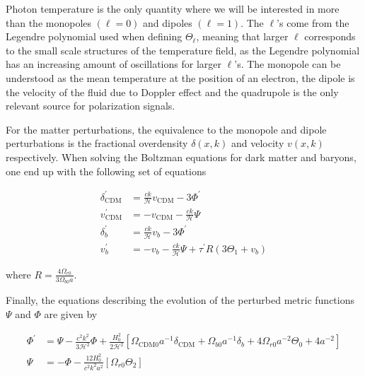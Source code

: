 \documentclass[12pt]{article}
\begin{document}
Photon temperature is the only quantity where we will be interested in more than the monopoles $(\ell = 0)$ and dipoles $(\ell = 1)$. The $\ell$'s come from the Legendre polynomial used when defining $\Theta_{\ell}$, meaning that larger $\ell$ corresponds to the small scale structures of the temperature field, as the Legendre polynomial has an increasing amount of oscillations for larger $\ell$'s. The monopole can be understood as the mean temperature at the position of an electron, the dipole is the velocity of the fluid due to Doppler effect and the quadrupole is the only relevant source for polarization signals. 


For the matter perturbations, the equivalence to the monopole and dipole perturbations is the fractional overdensity $\delta(x,k)$ and velocity $v(x,k)$ respectively. When solving the Boltzman equations for dark matter and baryons, one end up with the following set of equations

\begin{equation}\begin{aligned}\label{eq: matter perturbation dx}
    \delta_{\mathrm{CDM}}^{\prime} &=\frac{c k}{\mathcal{H}} v_{\mathrm{CDM}}-3 \Phi^{\prime} \\
    v_{\mathrm{CDM}}^{\prime} &=-v_{\mathrm{CDM}}-\frac{c k}{\mathcal{H}} \Psi \\
    \delta_{b}^{\prime} &=\frac{c k}{\mathcal{H}} v_{b}-3 \Phi^{\prime} \\
    v_{b}^{\prime} &=-v_{b}-\frac{c k}{\mathcal{H}} \Psi+\tau^{\prime} R\left(3 \Theta_{1}+v_{b}\right)
\end{aligned}\end{equation}

where $R=\frac{4 \Omega_{r 0}}{3 \Omega_{b 0} a}$. 

Finally, the equations describing the evolution of the perturbed metric functions $\Psi$ and $\Phi$ are given by 

\begin{equation}\begin{aligned}\label{eq phi psi}
    \Phi^{\prime} &=\Psi-\frac{c^{2} k^{2}}{3 \mathcal{H}^{2}} \Phi+\frac{H_{0}^{2}}{2 \mathcal{H}^{2}}\left[\Omega_{\mathrm{CDM} 0} a^{-1} \delta_{\mathrm{CDM}}+\Omega_{b 0} a^{-1} \delta_{b}+4 \Omega_{r 0} a^{-2} \Theta_{0}+4  a^{-2}\right] \\
    \Psi &=-\Phi-\frac{12 H_{0}^{2}}{c^{2} k^{2} a^{2}}\left[\Omega_{r 0} \Theta_{2}\right]
\end{aligned}\end{equation}
\end{document}
